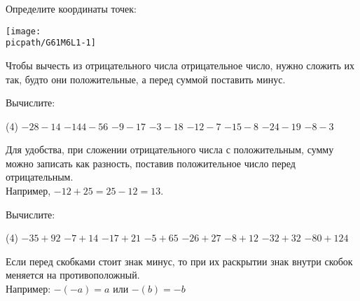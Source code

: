 %
%

\begin{class}[number=1]
	\begin{listofex}
		\item
		\begin{minipage}[t]{\bodywidth}
			Определите координаты точек:
		\end{minipage}
		\begin{minipage}[c]{0.45\textwidth}
			\texttt{[image: \\picpath/G61M6L1-1]}
		\end{minipage}
	\end{listofex}
		\begin{definit}
			Чтобы вычесть из отрицательного числа отрицательное число, нужно сложить их так, будто они положительные, а перед суммой поставить минус.
		\end{definit}
	\begin{listofex}[resume]
		\item Вычислите:
		\begin{tasks}(4)
			\task \( -28-14 \)
			\task \( -144-56 \)
			\task \( -9-17 \)
			\task \( -3-18 \)
			\task \( -12-7 \)
			\task \( -15-8 \)
			\task \( -24-19 \)
			\task \( -8-3 \)
		\end{tasks}
	\end{listofex}
		\begin{definit}
			Для удобства, при сложении отрицательного числа с положительным, сумму можно записать как разность, поставив положительное число перед отрицательным. \\ Например, \(-12+25=25-12=13\).
		\end{definit}
	\begin{listofex}[resume]
		\item Вычислите:
		\begin{tasks}(4)
			\task \( -35 + 92 \)
			\task \( -7+14 \)
			\task \( -17+21 \)
			\task \( -5+65 \)
			\task \( -26+27 \)
			\task \( -8+12 \)
			\task \( -32+32 \)
			\task \( -80+124 \)
		\end{tasks}
	\end{listofex}
		\begin{definit}
			Если перед скобками стоит знак минус, то при их раскрытии знак внутри скобок меняется на противоположный. \\ Например: \(-(-a) = a \) или \( -(b) = -b \)

\end{definit}
\end{class}
